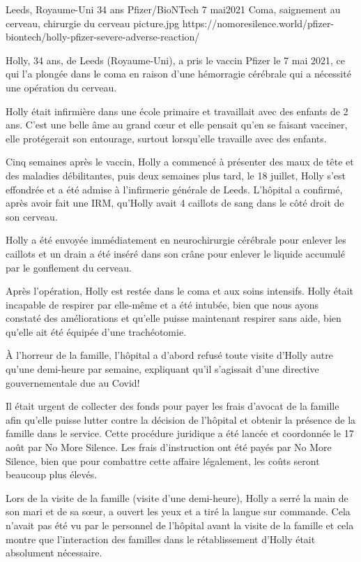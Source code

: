 {Leeds, Royaume-Uni}
{34 ans}
{Pfizer/BioNTech}
{7 mai2021}
{Coma, saignement au cerveau, chirurgie du cerveau}
{picture.jpg}
{https://nomoresilence.world/pfizer-biontech/holly-pfizer-severe-adverse-reaction/}
{

Holly, 34 ans, de Leeds (Royaume-Uni), a pris le vaccin Pfizer le 7 mai 2021, ce
qui l'a plongée dans le coma en raison d'une hémorragie cérébrale qui a
nécessité une opération du cerveau.

Holly était infirmière dans une école primaire et travaillait avec des enfants
de 2 ans. C'est une belle âme au grand cœur et elle pensait qu'en se faisant
vacciner, elle protégerait son entourage, surtout lorsqu'elle travaille avec des
enfants.

Cinq semaines après le vaccin, Holly a commencé à présenter des maux de tête et
des maladies débilitantes, puis deux semaines plus tard, le 18 juillet, Holly
s'est effondrée et a été admise à l'infirmerie générale de Leeds. L'hôpital a
confirmé, après avoir fait une IRM, qu'Holly avait 4 caillots de sang dans le
côté droit de son cerveau.

Holly a été envoyée immédiatement en neurochirurgie cérébrale pour enlever les
caillots et un drain a été inséré dans son crâne pour enlever le liquide
accumulé par le gonflement du cerveau.

Après l'opération, Holly est restée dans le coma et aux soins intensifs. Holly
était incapable de respirer par elle-même et a été intubée, bien que nous ayons
constaté des améliorations et qu'elle puisse maintenant respirer sans aide, bien
qu'elle ait été équipée d'une trachéotomie.

À l'horreur de la famille, l'hôpital a d'abord refusé toute visite d'Holly autre
qu'une demi-heure par semaine, expliquant qu'il s'agissait d'une directive
gouvernementale due au Covid!

Il était urgent de collecter des fonds pour payer les frais d'avocat de la
famille afin qu'elle puisse lutter contre la décision de l'hôpital et obtenir la
présence de la famille dans le service. Cette procédure juridique a été lancée
et coordonnée le 17 août par No More Silence. Les frais d'instruction ont été
payés par No More Silence, bien que pour combattre cette affaire légalement, les
coûts seront beaucoup plus élevés.

Lors de la visite de la famille (visite d'une demi-heure), Holly a serré la main
de son mari et de sa sœur, a ouvert les yeux et a tiré la langue sur
commande. Cela n'avait pas été vu par le personnel de l'hôpital avant la visite
de la famille et cela montre que l'interaction des familles dans le
rétablissement d'Holly était absolument nécessaire.

}
